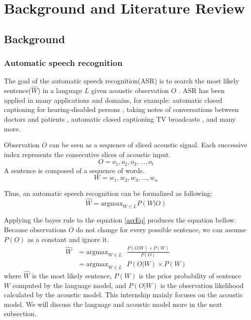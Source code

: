 \chapter{Background and Literature Review}

\section{Background}
\subsection{Automatic speech recognition}
\label{subsec:ASR}
The goal of the automatic speech recognition(ASR) is to search the most likely sentence($\hat{W}$) in a language $L$ given acoustic observation $O$ \cite{Jurafsky:2009:SLP:1214993}. ASR has been applied in many applications and domains, for example: automatic closed captioning for hearing-disabled persons \cite{Patel2010}, taking notes of conversations between doctors and patients \cite{Klann2008}, automatic closed captioning TV broadcasts \cite{Woodland2015}, and many more.

Observation $O$ can be seen as a sequence of sliced acoustic signal. Each successive index represents the consecutive slices of acoustic input.
\begin{equation}
O=o_{1},o_{2},o_{3},...,o_{t}
\end{equation} 
A sentence is composed of a sequence of words.
\begin{equation}
W = w_{1},w_{2},w_{3},...,w_{n}
\end{equation}


Thus, an automatic speech recognition can be formalized as following:
\begin{equation}
\label{asrEq}
\hat{W} = \textrm{argmax}_{W \in L} P(W|O)
\end{equation}

Applying the bayes rule to the equation \ref{asrEq} produces the equation bellow. Because observations $O$ do not change for every possible sentence, we can assume $P(O)$ as a constant and ignore it.
\begin{align}
\hat{W} & = \textrm{argmax}_{W \in L} \textrm{ } \frac{P(O|W) \times P(W)}{P(O)} \\
	& = \textrm{argmax}_{W \in L} \textrm{ } P(O|W) \times P(W)
\end{align}
where $\hat{W}$ is the most likely sentence, $P(W)$ is the prior probability of sentence $W$ computed by the language model, and $P(O|W)$ is the observation likelihood calculated by the acoustic model. This internship mainly focuses on the acoustic model. We will discuss the language and acoustic model more in the next subsection. 



